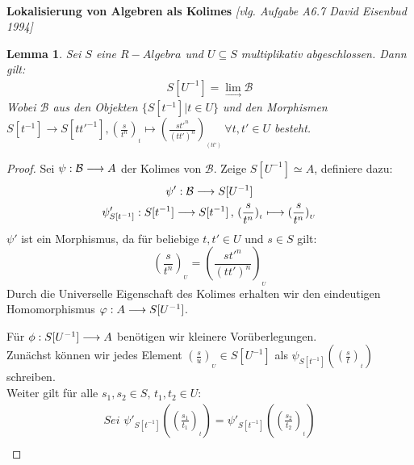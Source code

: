 \documentclass[10pt,a4paper]{report}
\newcommand{\comment}[1]{}
\newcommand{\ModulsOfDifferenzials}{David Eisenbud 1994}
\newcounter{Aussage}[chapter]
\newtheorem{lemma}[Aussage]{Lemma}
\newcommand{\functionfront}[3]{\nolinebreak{#1:#2 \longrightarrow #3}}
\newcommand{\function}[5]{\nolinebreak{#1:#2 \longrightarrow #3 \, , \, #4 \longmapsto #5}}
\newcommand{\lok}[2]{#1 [#2^{-1}]}
\newcommand{\loke}[3]{(\frac{#1}{#2})_{_{#3}}}
\newcommand{\colimes}[0]{\lim\limits_{ \longrightarrow }}
\begin{document}
\ \\
\textbf{Lokalisierung von Algebren als Kolimes} \textit{[vlg. Aufgabe A6.7 \ModulsOfDifferenzials]}
\begin{lemma}\label{Lokalisierung von Algebren als Kolimes}
Sei $S$ eine $R-Algebra$ und $U \subseteq S$ multiplikativ abgeschlossen.
Dann gilt:
\begin{gather*}
 S[U^{-1}] = \colimes \mathcal{B}
\end{gather*}
Wobei $\mathcal{B}$ aus den Objekten $\lbrace \lok{S}{t} \vert t \in U \rbrace$ und den Morphismen\\
$\lok{S}{t} \longrightarrow \lok{S}{tt'}, \loke{s}{t^n}{t} \longmapsto \loke{st'^n}{(tt')^n}{(tt')} \,
\forall t,t' \in U$ besteht.\\
\end{lemma}
\begin{proof}
Sei $\functionfront{\psi}{\mathcal{B}}{A}$ der Kolimes von $\mathcal{B}$. Zeige $\lok{S}{U} \simeq A$, definiere dazu:
\begin{gather*}
\functionfront{\psi'}{\mathcal{B}}{\lok{S}{U}}\\
\function{\psi'_{\lok{S}{t}}}{\lok{S}{t}}{\lok{S}{t}}{\loke{s}{t^n}{t}}{\loke{s}{t^n}{U}}
\end{gather*}
$\psi'$ ist ein Morphismus, da für beliebige $t,t' \in U$ und $s \in S$ gilt:
$$\loke{s}{t^n}{U} = \loke{st'^n}{(tt')^n}{U}$$
Durch die Universelle Eigenschaft des Kolimes erhalten wir den eindeutigen Homomorphismus $\functionfront{\varphi}{A}{\lok{S}{U}}$.
\begin{center}
\end{center}
Für $\functionfront{\phi}{S[U^{-1}]}{A}$ benötigen wir kleinere Vorüberlegungen.\\
Zunächst können wir jedes Element $\loke{s}{u}{U} \in \lok{S}{U}$ als $\psi_{\lok{S}{t}}(\loke{s}{t}{t})$ schreiben.\\
\comment{\label{wobei u = t}}
Weiter gilt für alle $s_1,s_2 \in S , \, t_1,t_2 \in U$: 
\begin{align*}
\textit{Sei }\psi'_{\lok{S}{t}}(\loke{s_1}{t_1}{t}) = \psi'_{\lok{S}{t}}(\loke{s_2}{t_2}{t})\\

\end{align*}
\end{proof}
\end{document}
